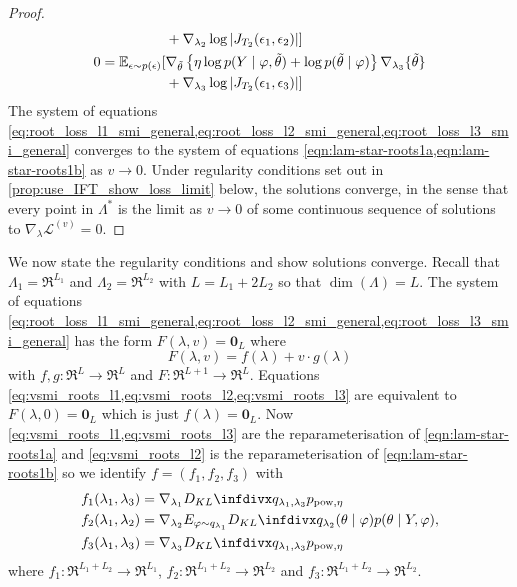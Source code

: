 \begin{proof}
\begin{align}
                                        & + \nabla_{\lambda_2} \log \left\vert J_{T_2}(\epsilon_1,\epsilon_2) \right\vert  ] \label{eq:root_loss_l2_smi_general}                                                 \\
    0 = \operatorname{\mathbb{E}}_{\epsilon \sim p(\epsilon)}[ & \nabla_{\tilde\theta} \left\{ \eta \log p(Y \mid \varphi, \tilde\theta) + \log p(\tilde\theta \mid \varphi) \right\} \nabla_{\lambda_3} \{ \tilde\theta \} \nonumber   \\
                                        & + \nabla_{\lambda_3} \log \left\vert J_{T_2}(\epsilon_1,\epsilon_3) \right\vert  ] \label{eq:root_loss_l3_smi_general}
  \end{align}
  The system of equations \cref{eq:root_loss_l1_smi_general,eq:root_loss_l2_smi_general,eq:root_loss_l3_smi_general} converges to the system of equations \cref{eqn:lam-star-roots1a,eqn:lam-star-roots1b} as $v\to 0$. Under regularity conditions set out in \cref{prop:use_IFT_show_loss_limit} below, the solutions converge, in the sense that every point in $\Lambda^*$ is the limit as $v\to 0$ of some continuous sequence of solutions to $\nabla_\lambda\mathcal{L}^{(v)}=0$.
\end{proof}

We now state the regularity conditions and show solutions converge. Recall that $\Lambda_1=\Re^{L_1}$ and $\Lambda_2=\Re^{L_2}$ with $L=L_1+2L_2$ so that $\dim(\Lambda)=L$. The system of equations \cref{eq:root_loss_l1_smi_general,eq:root_loss_l2_smi_general,eq:root_loss_l3_smi_general} has the form $F(\lambda,v)=\mathbf{0}_L$ where
\[
  F(\lambda,v)=f(\lambda)+v\cdot g(\lambda)
\]
with $f,g:\Re^L\to \Re^L$ and $F:\Re^{L+1}\to \Re^L$. Equations \cref{eq:vsmi_roots_l1,eq:vsmi_roots_l2,eq:vsmi_roots_l3} are equivalent to $F(\lambda,0)=\mathbf{0}_L$ which is just $f(\lambda)=\mathbf{0}_L$. Now \cref{eq:vsmi_roots_l1,eq:vsmi_roots_l3} are the reparameterisation of \cref{eqn:lam-star-roots1a} and \cref{eq:vsmi_roots_l2} is the reparameterisation of \cref{eqn:lam-star-roots1b} so we identify
$f=(f_1,f_2,f_3)$ with
\begin{align*}
  f_1(\lambda_1,\lambda_3) & =\nabla_{\lambda_1}\kl{q_{\lambda_1,\lambda_3}}{p_{\pow, \eta}}                                                    \\
  f_2(\lambda_1,\lambda_2) & =\nabla_{\lambda_2} E_{\varphi\sim q_{\lambda_1}}\kl{q_{\lambda_2}(\theta\mid \varphi)}{p(\theta \mid Y,\varphi)}, \\
  f_3(\lambda_1,\lambda_3) & =\nabla_{\lambda_3}\kl{q_{\lambda_1,\lambda_3}}{p_{\pow, \eta}}
\end{align*}
where $f_1: \Re^{L_1+L_2}\to \Re^{L_1}$, $f_2: \Re^{L_1+L_2}\to \Re^{L_2}$ and $f_3: \Re^{L_1+L_2}\to \Re^{L_2}$.

